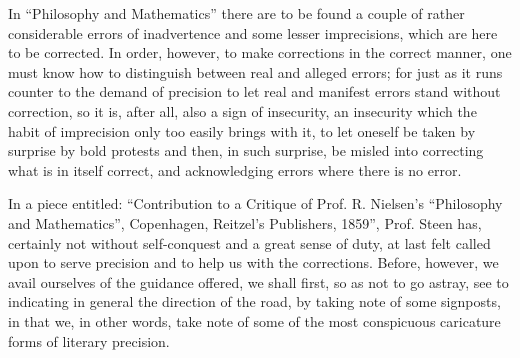 \documentclass[12pt,a4paper,openany]{book}
\newcommand{\opage}[1]{\marginnote{\footnotesize\textit{[#1]}}}
\begin{document}
In ``Philosophy and Mathematics'' there are to be found a couple of rather considerable errors of inadvertence and some lesser imprecisions,
which are here to be corrected. In order, however, to make corrections in the correct manner, one must know how to distinguish between
real and alleged errors; for just as it runs counter to the demand of precision to let real and manifest errors stand without correction, so it is, after all, also a
sign of insecurity, an insecurity which the habit of imprecision only too easily brings with it, to let oneself be taken by surprise by
bold protests and then, in such surprise, be misled into
correcting what is in itself correct, and acknowledging errors where there is
no error.

\opage{4}\setcounter{footnote}{0}%
In a piece entitled: ``Contribution to a Critique of Prof.
R. Nielsen's ``Philosophy and Mathematics'', Copenhagen,
Reitzel's Publishers, 1859'', Prof. Steen has, certainly not
without self-conquest and a great sense of duty, at last felt
called upon to serve precision and to help us with the
corrections. Before, however, we avail ourselves of the guidance offered, we shall first, so as not to go astray,
see to indicating in general the direction of the road, by taking note of
some signposts, in that we, in other words, take note of
some of the most conspicuous caricature forms of literary precision.
\end{document}
